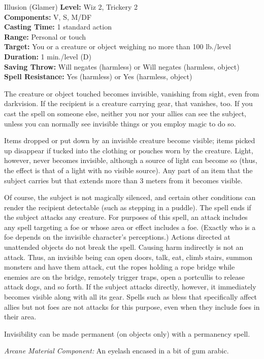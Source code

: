 {Illusion (Glamer)}
{
	\textbf{Level:}
	Wiz 2, Trickery 2\\
	\textbf{Components:}
	V, S, M/DF\\
	\textbf{Casting Time:}
	1 standard action\\
	\textbf{Range:}
	Personal or touch\\
	\textbf{Target:}
	You or a creature or object weighing no more than 100 lb./level\\
	\textbf{Duration:}
	1 min./level (D)\\
	\textbf{Saving Throw:}
	Will negates (harmless) or Will negates (harmless, object)\\
	\textbf{Spell Resistance:}
	Yes (harmless) or Yes (harmless, object)\\
}
{
	The creature or object touched becomes invisible, vanishing from sight, even from darkvision. If the recipient is a creature carrying gear, that vanishes, too. If you cast the spell on someone else, neither you nor your allies can see the subject, unless you can normally see invisible things or you employ magic to do so.

	Items dropped or put down by an invisible creature become visible; items picked up disappear if tucked into the clothing or pouches worn by the creature. Light, however, never becomes invisible, although a source of light can become so (thus, the effect is that of a light with no visible source). Any part of an item that the subject carries but that extends more than 3 meters from it becomes visible.

	Of course, the subject is not magically silenced, and certain other conditions can render the recipient detectable (such as stepping in a puddle). The spell ends if the subject attacks any creature. For purposes of this spell, an attack includes any spell targeting a foe or whose area or effect includes a foe. (Exactly who is a foe depends on the invisible character's perceptions.) Actions directed at unattended objects do not break the spell. Causing harm indirectly is not an attack. Thus, an invisible being can open doors, talk, eat, climb stairs, summon monsters and have them attack, cut the ropes holding a rope bridge while enemies are on the bridge, remotely trigger traps, open a portcullis to release attack dogs, and so forth. If the subject attacks directly, however, it immediately becomes visible along with all its gear. Spells such as bless that specifically affect allies but not foes are not attacks for this purpose, even when they include foes in their area.

	Invisibility can be made permanent (on objects only) with a permanency spell.

	\textit{Arcane Material Component:}
	An eyelash encased in a bit of gum arabic.

}
